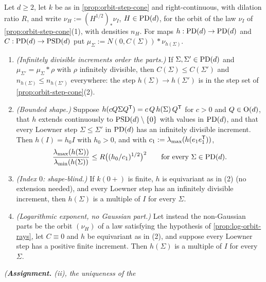 \begin{proposition}
\label{prop:similarity-orbit-family}
\leanok
Let $d \ge 2$, let $k$ be as in \ref{prop:orbit-step-cone} and right-continuous, with dilation ratio
$R$, and write $\nu_H := (H^{1/2})_*\nu_I$, $H \in \mathrm{PD}(d)$, for the orbit of the law $\nu_I$ of
\ref{prop:orbit-step-cone}(1), with \Levy{} densities $n_H$. For maps $h : \mathrm{PD}(d) \to \mathrm{PD}(d)$ and
$C : \mathrm{PD}(d) \to \mathrm{PSD}(d)$ put $\mu_\Sigma := N(0,C(\Sigma)) * \nu_{h(\Sigma)}$.
\begin{enumerate}
\item \emph{(Infinitely divisible increments order the parts.)} If $\Sigma, \Sigma' \in \mathrm{PD}(d)$ and
$\mu_{\Sigma'} = \mu_\Sigma * \rho$ with $\rho$ infinitely divisible, then $C(\Sigma) \le C(\Sigma')$
and $n_{h(\Sigma)} \le n_{h(\Sigma')}$ everywhere: the step $h(\Sigma) \to h(\Sigma')$ is in the step
set of \ref{prop:orbit-step-cone}(2).
\item \emph{(Bounded shape.)} Suppose $h(cQ\Sigma Q^{\mathsf{T}}) = c\,Q\,h(\Sigma)\,Q^{\mathsf{T}}$ for $c > 0$ and
$Q \in \mathrm{O}(d)$, that $h$ extends continuously to $\mathrm{PSD}(d) \setminus \{0\}$ with values in $\mathrm{PD}(d)$,
and that every Loewner step $\Sigma \le \Sigma'$ in $\mathrm{PD}(d)$ has an infinitely divisible increment.
Then $h(I) = h_0I$ with $h_0 > 0$, and with $c_1 := \lambda_{\max}(h(e_1e_1^{\mathsf{T}}))$,
\[
  \frac{\lambda_{\max}(h(\Sigma))}{\lambda_{\min}(h(\Sigma))} \le R\bigl((h_0/c_1)^{1/2}\bigr)^2
  \qquad \text{for every } \Sigma \in \mathrm{PD}(d) .
\]
\item \emph{(Index $0$: shape-blind.)} If $k(0{+})$ is finite, $h$ is equivariant as in (2) (no
extension needed), and every Loewner step has an infinitely divisible increment, then $h(\Sigma)$
is a multiple of $I$ for every $\Sigma$.
\item \emph{(Logarithmic exponent, no Gaussian part.)} Let instead the non-Gaussian parts be the
orbit $(\nu_H)$ of a law satisfying the hypothesis of \ref{prop:log-orbit-rays}, let $C \equiv 0$
and $h$ be equivariant as in (2), and suppose every Loewner step has a positive finite increment.
Then $h(\Sigma)$ is a multiple of $I$ for every $\Sigma$.
\end{enumerate}
\statusA\quad{}\quad\emph{(\textbf{Assignment.} (ii), the uniqueness of the
}
\end{proposition}
